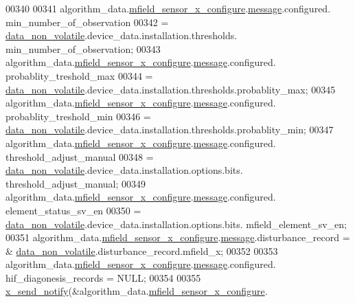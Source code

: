\begin{DoxyCode}
{{{{{00340 
00341     algorithm\_data.\hyperlink{a00016_a1bfdf4869db9c4f125b763d2e27c6c08}{mfield\_sensor\_x\_configure}.\hyperlink{a00019_ae926905663cb8ca01f1bc2d670e428f5}{message}.configured.
      min\_number\_of\_observation
00342                    = \hyperlink{a00060_a76ac5f917f5308dcd83de0d7c94559fb}{data\_non\_volatile}.device\_data.installation.thresholds.
      min\_number\_of\_observation;
00343     algorithm\_data.\hyperlink{a00016_a1bfdf4869db9c4f125b763d2e27c6c08}{mfield\_sensor\_x\_configure}.\hyperlink{a00019_ae926905663cb8ca01f1bc2d670e428f5}{message}.configured.
      probablity\_treshold\_max
00344                    = \hyperlink{a00060_a76ac5f917f5308dcd83de0d7c94559fb}{data\_non\_volatile}.device\_data.installation.thresholds.probablity\_max;
00345     algorithm\_data.\hyperlink{a00016_a1bfdf4869db9c4f125b763d2e27c6c08}{mfield\_sensor\_x\_configure}.\hyperlink{a00019_ae926905663cb8ca01f1bc2d670e428f5}{message}.configured.
      probablity\_treshold\_min
00346                    = \hyperlink{a00060_a76ac5f917f5308dcd83de0d7c94559fb}{data\_non\_volatile}.device\_data.installation.thresholds.probablity\_min;
00347     algorithm\_data.\hyperlink{a00016_a1bfdf4869db9c4f125b763d2e27c6c08}{mfield\_sensor\_x\_configure}.\hyperlink{a00019_ae926905663cb8ca01f1bc2d670e428f5}{message}.configured.
      threshold\_adjust\_manual
00348                    = \hyperlink{a00060_a76ac5f917f5308dcd83de0d7c94559fb}{data\_non\_volatile}.device\_data.installation.options.bits.
      threshold\_adjust\_manual;
00349     algorithm\_data.\hyperlink{a00016_a1bfdf4869db9c4f125b763d2e27c6c08}{mfield\_sensor\_x\_configure}.\hyperlink{a00019_ae926905663cb8ca01f1bc2d670e428f5}{message}.configured.
      element\_status\_sv\_en
00350                    = \hyperlink{a00060_a76ac5f917f5308dcd83de0d7c94559fb}{data\_non\_volatile}.device\_data.installation.options.bits.
      mfield\_element\_sv\_en;
00351     algorithm\_data.\hyperlink{a00016_a1bfdf4869db9c4f125b763d2e27c6c08}{mfield\_sensor\_x\_configure}.\hyperlink{a00019_ae926905663cb8ca01f1bc2d670e428f5}{message}.disturbance\_record = &
      \hyperlink{a00060_a76ac5f917f5308dcd83de0d7c94559fb}{data\_non\_volatile}.disturbance\_record.mfield\_x;
00352   
00353     algorithm\_data.\hyperlink{a00016_a1bfdf4869db9c4f125b763d2e27c6c08}{mfield\_sensor\_x\_configure}.\hyperlink{a00019_ae926905663cb8ca01f1bc2d670e428f5}{message}.configured.
      hif\_diagonesis\_records = NULL;
00354 
00355     \hyperlink{a00036_ae17b0bb16da3c471bb6074bb4c4d0fee}{x\_send\_notify}(&algorithm\_data.\hyperlink{a00016_a1bfdf4869db9c4f125b763d2e27c6c08}{mfield\_sensor\_x\_configure}.
}}}}}
\end{DoxyCode}
